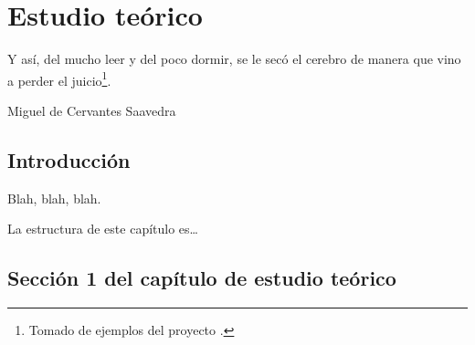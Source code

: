 %
%
%
% 
%
%
%
%

\chapter{Estudio teórico}
\label{cha:estudio-teorico}

\begin{FraseCelebre}
  \begin{Frase}
    Y así, del mucho leer y del poco dormir, se le secó el cerebro de
    manera que vino a perder el juicio\footnote{Tomado de ejemplos del
      proyecto \texis{}.}.
  \end{Frase}
  \begin{Fuente}
    Miguel de Cervantes Saavedra
  \end{Fuente}
\end{FraseCelebre}


\section{Introducción}
\label{sec:theory-introduction}

Blah, blah, blah.

La estructura de este capítulo es\ldots


\section{Sección 1 del capítulo de estudio teórico}
\label{sec:theory-1}

